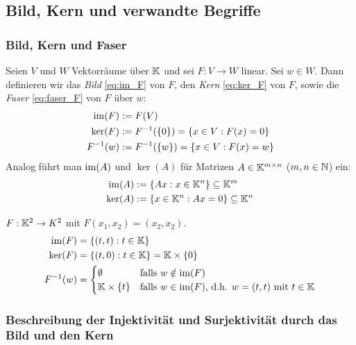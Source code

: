 \clearpage
\subsection{Bild, Kern und verwandte Begriffe}

\subsubsection{Bild, Kern und Faser}

Seien $ V $ und $ W $ Vektorräume über $ \mathbb K $ und sei $ F : V \to W $ linear. Sei $ w \in W $. Dann definieren wir das \emph{Bild} \eqref{eq:im_F} von $ F $, den \emph{Kern} \eqref{eq:ker_F} von $ F $, sowie die \emph{Faser} \eqref{eq:faser_F} von $ F $ über $ w $:
\begin{align}
	\operatorname{im}(F) &:= F(V)
	\label{eq:im_F}\\
	\ker(F) &:= F^{-1}(\{0\}) = \{ x \in V : F(x) = 0 \}
	\label{eq:ker_F}\\
	F^{-1}(w) &:= F^{-1}(\{w\}) = \{ x \in V : F(x) = w \}
	\label{eq:faser_F}
\end{align}
Analog führt man $ \operatorname{im}(A) $ und $ \ker(A) $ für Matrizen $ A\in\mathbb K^{m \times n} $ ($ m,n\in\mathbb N $) ein:
\begin{align}
	\operatorname{im}(A) &:= \{ Ax : x \in \mathbb K^n \} \subseteq \mathbb K^m\\
	\ker(A) &:= \{ x \in \mathbb K^n : Ax = 0 \} \subseteq \mathbb K^n
\end{align}

\begin{bsp}
	$ F : \mathbb K^2 \to K^2 $ mit $ F(x_1,x_2) = (x_2,x_2) $.
	\begin{align*}
		\operatorname{im}(F) &= \{ (t,t) : t \in \mathbb K \}\\
		\ker(F) &= \{ (t,0) : t \in \mathbb K \} = \mathbb K \times \{0\}\\
		F^{-1}(w) &=
		\begin{cases}
			\emptyset & \text{falls $ w \notin \operatorname{im}(F) $}\\
			\mathbb K \times \{t\} & \text{falls $ w \in \operatorname{im}(F) $, d.h. $ w = (t,t) $ mit $ t\in\mathbb K $}
		\end{cases}
	\end{align*}
\end{bsp}

\subsubsection{Beschreibung der Injektivität und Surjektivität durch das Bild und den Kern}


